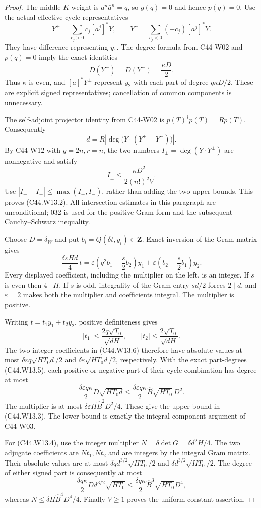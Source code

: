 \documentclass[11pt]{article}
\theoremstyle{remark}\newtheorem{remark}[theorem]{Remark}
\begin{document}
\begin{proof}
The middle $K$-weight is $a^n\bar a^n=q$, so $g(q)=0$ and hence
$p(q)=0$. Use the actual effective cycle representatives
\[
 Y^+=\sum_{c_j>0}c_j[a^j]^*Y,\qquad
 Y^-=\sum_{c_j<0}(-c_j)[a^j]^*Y.
\]
They have difference representing $y_1$. The degree formula from
C44-W02 and $p(q)=0$ imply the exact identities
\[
       D(Y^+)=D(Y^-)=\frac{\kappa D}{2}.
 \tag{C44.W13.5}
\]
Thus $\kappa$ is even, and $[a]^*Y^\pm$ represent $y_2$ with
each part of degree $q\kappa D/2$. These are explicit signed
representatives; cancellation of common components is unnecessary.

The self-adjoint projector identity from C44-W02 is
$p(T)^\dagger p(T)=Rp(T)$. Consequently
\[
 d=R\left|\deg\bigl(Y\cdot(Y^+-Y^-)\bigr)\right|.
\]
By C44-W12 with $g=2n,r=n$, the two numbers
$I_\pm=\deg(Y\cdot Y^\pm)$ are nonnegative and satisfy
\[
              I_\pm\leq\frac{\kappa D^2}{2(n!)^2V}.
\]
Use $|I_+-I_-|\leq\max(I_+,I_-)$, rather than adding the two
upper bounds. This proves (C44.W13.2). All intersection estimates
in this paragraph are unconditional; 032 is used for the positive
Gram form and the subsequent Cauchy--Schwarz inequality.

Choose $D=\delta_W$ and put $b_i=Q(\delta t,y_i)\in\mathbf Z$.
Exact inversion of the Gram matrix gives
\[
 \frac{\delta\varepsilon Hd}{4}\,t
   =\varepsilon\left(q^2b_1-\frac{s}{2}b_2\right)y_1
        +\varepsilon\left(b_2-\frac{s}{2}b_1\right)y_2.
 \tag{C44.W13.6}
\]
Every displayed coefficient, including the multiplier on the left,
is an integer. If $s$ is even then $4\mid H$. If $s$ is odd,
integrality of the Gram entry $sd/2$ forces $2\mid d$, and
$\varepsilon=2$ makes both the multiplier and coefficients integral.
The multiplier is positive.

Writing $t=t_1y_1+t_2y_2$, positive definiteness gives
\[
 |t_1|\leq\frac{2q\sqrt{T_0}}{\sqrt{dH}},\qquad
 |t_2|\leq\frac{2\sqrt{T_0}}{\sqrt{dH}}.
\]
The two integer coefficients in (C44.W13.6) therefore have
absolute values at most
$\delta\varepsilon q\sqrt{HT_0d}/2$ and
$\delta\varepsilon\sqrt{HT_0d}/2$, respectively. With the exact
part-degrees (C44.W13.5), each positive or negative part of their
cycle combination has degree at most
\[
 \frac{\delta\varepsilon q\kappa}{2}
            D\sqrt{HT_0d}
    \leq\frac{\delta\varepsilon q\kappa}{2}
            \widehat B\sqrt{HT_0}\,D^2.
\]
The multiplier is at most
$\delta\varepsilon H\widehat B^2D^2/4$. These give the upper
bound in (C44.W13.3). The lower bound is exactly the integral
component argument of C44-W03.

For (C44.W13.4), use the integer multiplier
$N=\delta\det G=\delta d^2H/4$. The two adjugate coefficients
are $Nt_1,Nt_2$ and are integers by the integral Gram matrix.
Their absolute values are at most
$\delta qd^{3/2}\sqrt{HT_0}/2$ and
$\delta d^{3/2}\sqrt{HT_0}/2$. The degree of either signed part
is consequently at most
\[
        \frac{\delta q\kappa}{2}D d^{3/2}\sqrt{HT_0}
       \leq\frac{\delta q\kappa}{2}
                         \widehat B^3\sqrt{HT_0}D^4,
\]
whereas $N\leq\delta H\widehat B^4D^4/4$.
Finally $V\geq1$ proves the uniform-constant assertion.
\end{proof}
\end{document}
